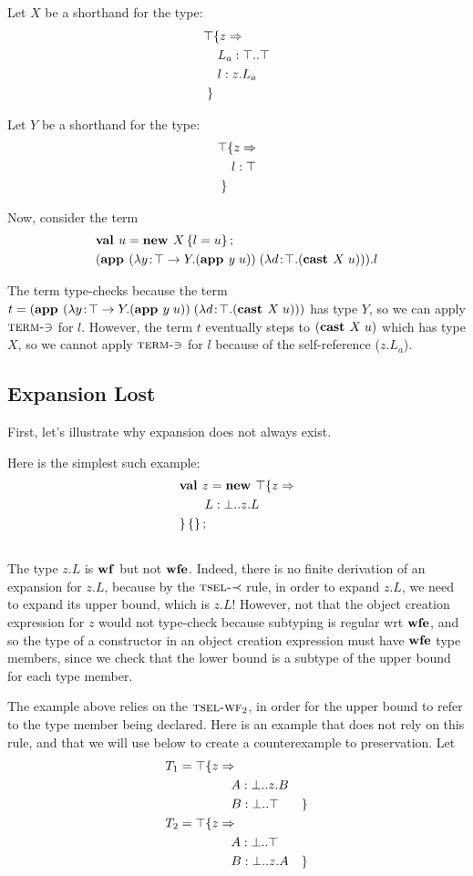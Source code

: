 \documentclass[9pt]{sigplanconf}
\begin{document}
Let $X$ be a shorthand for the type:
\begin{align*}
\top & \{z \Rightarrow \\
&\ L_a : \top..\top\\
&\ l : z.L_a\\
 \}&
\end{align*}

Let $Y$ be a shorthand for the type:
\begin{align*}
\top & \{z \Rightarrow \\
&\ l : \top\\
 \}&
\end{align*}

Now, consider the term
\begin{align*}
&\mlnew u {X \ldefs{ l = u }}{
\app {(\abs y {\Top \tfun Y} {\app y u})} {(\abs d \Top {\cast X u})}.l
}
\end{align*}

The term type-checks because the term $t=(\textbf{app }(\lambda y\!:\!\top \rightarrow Y.(\textbf{app }y\;u))\;(\lambda d\!:\!\top.(\textbf{cast }X\;u)))$ has type
$Y$, so we can apply $\textsc{term-$\ni$}$ for $l$. However, the term
$t$ eventually steps to ${(\textbf{cast }X\;u)}$ which has type $X$,
so we cannot apply $\textsc{term-$\ni$}$ for $l$ because of the
self-reference ($z.L_a$).

\subsection{Expansion Lost}\label{narrowing_exp}

First, let's illustrate why expansion does not always exist.

Here is the simplest such example:
\begin{align*}
&\textbf{val }z = \textbf{new }\top \{z \Rightarrow \\
&\quad\quad L : \bot..z.L\\
& \}\left\{\right\} ;\;\\&
\end{align*}
The type $z.L$ is $\mbox{\textbf{wf}}$ but not $\mbox{\textbf{wfe}}$. Indeed, there is no finite
derivation of an expansion for $z.L$, because by the
$\textsc{tsel-$\prec$}$ rule, in order to expand $z.L$, we need to
expand its upper bound, which is $z.L$! However, not that the object
creation expression for $z$ would not type-check because subtyping is
regular wrt $\mbox{\textbf{wfe}}$, and so the type of a constructor in an object
creation expression must have $\mbox{\textbf{wfe}}$ type members, since we check
that the lower bound is a subtype of the upper bound for each type
member.

The example above relies on the $\textsc{tsel-wf$_2$}$, in order for
the upper bound to refer to the type member being declared. Here is an
example that does not rely on this rule, and that we will use below to
create a counterexample to preservation. Let
\begin{align*}
T_1 = \top &\{z \Rightarrow &\\
&\quad\quad A : \bot..z.B&\\
&\quad\quad B : \bot..\top& \}\\
T_2 = \top &\{z \Rightarrow &\\
&\quad\quad A : \bot..\top&\\
&\quad\quad B : \bot..z.A& \}
\end{align*}
\end{document}
